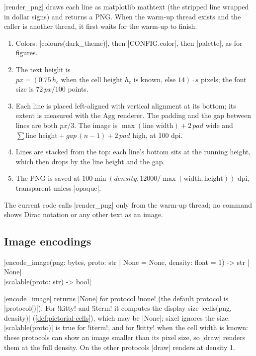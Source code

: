 {\py|render_png| draws each line as matplotlib mathtext (the stripped line wrapped in dollar
signs) and returns a PNG. When the warm-up thread exists and the caller is another thread, it
first waits for the warm-up to finish.
\begin{enumerate}
  \item Colors: \py|colours(dark_theme)|, then \py|CONFIG.color|, then \py|palette|, as for
    figures.
  \item The text height is $\mathit{px} = (0.75\,h_c \text{ when the cell height } h_c
    \text{ is known, else } 14)\cdot s$ pixels; the font size is $72\,\mathit{px}/100$ points.
  \item Each line is placed left-aligned with vertical alignment at its bottom; its extent is
    measured with the Agg renderer. The padding and the gap between lines are both
    $\mathit{px}/3$. The image is $\max(\text{line width}) + 2\,\mathit{pad}$ wide and
    $\sum\text{line height} + \mathit{gap}\,(n-1) + 2\,\mathit{pad}$ high, at 100 dpi.
  \item Lines are stacked from the top: each line's bottom sits at the running height, which
    then drops by the line height and the gap.
  \item The PNG is saved at $100\min(\mathit{density}, 12000/\max(\text{width},
    \text{height}))$ dpi, transparent unless \py|opaque|.
\end{enumerate}
The current code calls \py|render_png| only from the warm-up thread; no command shows Dirac
notation or any other text as an image.

\subsection{Image encodings}\label{sec:pictorial-encodings}

\begin{signature}
\py|encode_image(png: bytes, proto: str | None = None, density: float = 1) -> str | None|\\
\py|scalable(proto: str) -> bool|
\end{signature}

\py|encode_image| returns \py|None| for protocol \code!none! (the default protocol is
\py|protocol()|). For \code!kitty! and \code!iterm! it computes the display size
\py|cells(png, density)| (\cref{def:pictorial-cells}), which may be \py|None|; sixel ignores the
size. \py|scalable(proto)| is true for \code!iterm!, and for \code!kitty! when the cell width is
known: these protocols can show an image smaller than its pixel size, so \py|draw| renders them
at the full density. On the other protocols \py|draw| renders at density 1.

}
